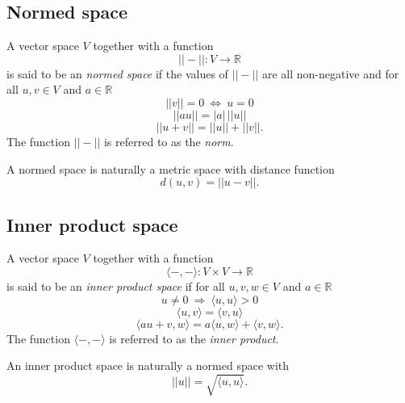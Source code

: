 \documentclass{amsart}
\begin{document}
	\subsection*{Normed space} \label{normed_space}
	A vector space $V$ together with a function	
	\begin{equation*}	
	||-|| : V \to \mathbb R	
	\end{equation*}	
	is said to be an \textit{normed space} if the values of $||-||$ are all non-negative and for all $u,v \in V$ and $a \in \mathbb R$	
	\begin{equation*}	
	||v|| = 0\ \Leftrightarrow\ u = 0	
	\end{equation*}	
	\begin{equation*}	
	||a u || = |a|\, ||u||	
	\end{equation*}	
	\begin{equation*}	
	||u+v|| = ||u|| + ||v||.	
	\end{equation*}	
	The function $||-||$ is referred to as the \textit{norm}.
	
	A normed space is naturally a
	metric space with distance function	
	\begin{equation*}	
	d(u,v) = ||u-v||.	
	\end{equation*}
	
	\subsection*{Inner product space} \label{inner_product_space}	
	
	A vector space $V$ together with a function
	\begin{equation*}	
	\langle -, - \rangle : V \times V \to \mathbb R	
	\end{equation*}
	is said to be an \textit{inner product space} if for all $u,v,w \in V$ and $a \in \mathbb R$
	\begin{equation*}	
	u \neq 0\ \Rightarrow\ \langle u, u \rangle > 0 	
	\end{equation*}	
	\begin{equation*}	
	\langle u, v\rangle = \langle v, u\rangle	
	\end{equation*}
	\begin{equation*}
	\langle au+v, w \rangle = a\langle u, w \rangle + \langle v, w \rangle.	
	\end{equation*}	
	The function $\langle -, - \rangle$ is referred to as the \textit{inner product}.
	
	An inner product space is naturally a normed space with	
	\begin{equation*}	
	||u|| = \sqrt{\langle u, u \rangle}.
	\end{equation*}
	
\end{document}
